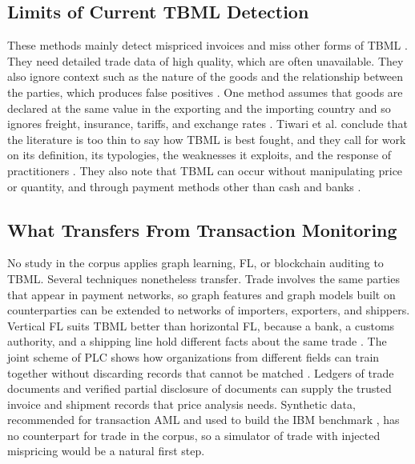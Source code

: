 \documentclass[journal]{IEEEtran}
\begin{document}
\subsection{Limits of Current TBML Detection}

These methods mainly detect mispriced invoices and miss other forms of TBML \cite{tiwari2025tbml}. They need detailed trade data of high quality, which are often unavailable. They also ignore context such as the nature of the goods and the relationship between the parties, which produces false positives \cite{tiwari2025tbml}. One method assumes that goods are declared at the same value in the exporting and the importing country and so ignores freight, insurance, tariffs, and exchange rates \cite{tiwari2025tbml}. Tiwari et al. conclude that the literature is too thin to say how TBML is best fought, and they call for work on its definition, its typologies, the weaknesses it exploits, and the response of practitioners \cite{tiwari2025tbml}. They also note that TBML can occur without manipulating price or quantity, and through payment methods other than cash and banks \cite{tiwari2025tbml}.

\subsection{What Transfers From Transaction Monitoring}

No study in the corpus applies graph learning, FL, or blockchain auditing to TBML. Several techniques nonetheless transfer. Trade involves the same parties that appear in payment networks, so graph features and graph models built on counterparties \cite{irshad2024gcfmld,mao2026pmegnn} can be extended to networks of importers, exporters, and shippers. Vertical FL suits TBML better than horizontal FL, because a bank, a customs authority, and a shipping line hold different facts about the same trade \cite{li2026plc}. The joint scheme of PLC shows how organizations from different fields can train together without discarding records that cannot be matched \cite{li2026plc}. Ledgers of trade documents \cite{dudczyk2024supply} and verified partial disclosure of documents \cite{cosmin2024notary} can supply the trusted invoice and shipment records that price analysis needs. Synthetic data, recommended for transaction AML \cite{ferretti2025gnn,jensen2023fighting} and used to build the IBM benchmark \cite{altman2023ibmaml}, has no counterpart for trade in the corpus, so a simulator of trade with injected mispricing would be a natural first step.
\end{document}
